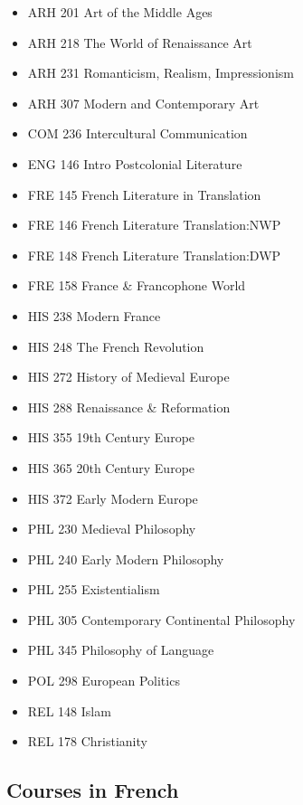 \documentclass[
  letterpaper,
]{scrbook}
\providecommand{\tightlist}{%
  \setlength{\itemsep}{0pt}\setlength{\parskip}{0pt}}
\begin{document}
\begin{itemize}
\tightlist
\item
  ARH 201 Art of the Middle Ages
\item
  ARH 218 The World of Renaissance Art
\item
  ARH 231 Romanticism, Realism, Impressionism
\item
  ARH 307 Modern and Contemporary Art
\item
  COM 236 Intercultural Communication
\item
  ENG 146 Intro Postcolonial Literature
\item
  FRE 145 French Literature in Translation
\item
  FRE 146 French Literature Translation:NWP
\item
  FRE 148 French Literature Translation:DWP
\item
  FRE 158 France \& Francophone World
\item
  HIS 238 Modern France
\item
  HIS 248 The French Revolution
\item
  HIS 272 History of Medieval Europe
\item
  HIS 288 Renaissance \& Reformation
\item
  HIS 355 19th Century Europe
\item
  HIS 365 20th Century Europe
\item
  HIS 372 Early Modern Europe
\item
  PHL 230 Medieval Philosophy
\item
  PHL 240 Early Modern Philosophy
\item
  PHL 255 Existentialism
\item
  PHL 305 Contemporary Continental Philosophy
\item
  PHL 345 Philosophy of Language
\item
  POL 298 European Politics
\item
  REL 148 Islam
\item
  REL 178 Christianity
\end{itemize}

\subsection{Courses in French}\label{courses-in-french}
\end{document}
